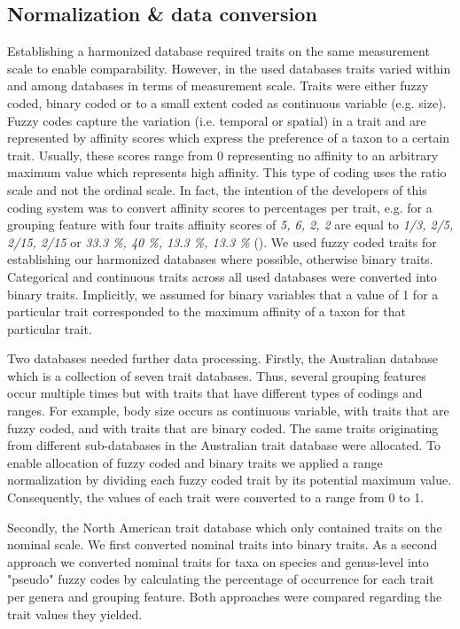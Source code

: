 \documentclass{article}
\begin{document}
\subsection{Normalization \& data conversion}

Establishing a harmonized database required traits on the same measurement scale to enable comparability. However, in the used databases traits varied within and among databases in terms of measurement scale. Traits were either fuzzy coded, binary coded or to a small extent coded as continuous variable (e.g. size). Fuzzy codes capture the variation (i.e. temporal or spatial) in a trait and are represented by affinity scores which express the preference of a taxon to a certain trait. Usually, these scores range from 0 representing no affinity to an arbitrary maximum value which represents high affinity. This type of coding uses the ratio scale and not the ordinal scale. In fact, the intention of the developers of this coding system was to convert affinity scores to percentages per trait, e.g. for a grouping feature with four traits affinity scores of \textit{5, 6, 2, 2} are equal to \textit{1/3, 2/5, 2/15, 2/15} or \textit{33.3 \%, 40 \%, 13.3 \%, 13.3 \%} (\cite{chevenet_francois_fuzzy_1994}). We used fuzzy coded traits for establishing our harmonized databases where possible, otherwise binary traits. Categorical and continuous traits across all used databases were converted into binary traits. Implicitly, we assumed for binary variables that a value of 1 for a particular trait corresponded to the maximum affinity of a taxon for that particular trait.

Two databases needed further data processing. Firstly, the Australian database which is a collection of seven trait databases. Thus, several grouping features occur multiple times but with traits that have different types of codings and ranges. For example, body size occurs as continuous variable, with traits that are fuzzy coded, and with traits that are binary coded. The same traits originating from different sub-databases in the Australian trait database were allocated. To enable allocation of fuzzy coded and binary traits we applied a range normalization by dividing each fuzzy coded trait by its potential maximum value. Consequently, the values of each trait were converted to a range from 0 to 1.

Secondly, the North American trait database which only contained traits on the nominal scale. We first converted nominal traits into binary traits. As a second approach we converted nominal traits for taxa on species and genus-level into "pseudo" fuzzy codes by calculating the percentage of occurrence for each trait per genera and grouping feature. Both approaches were compared regarding the trait values they yielded.
\end{document}
